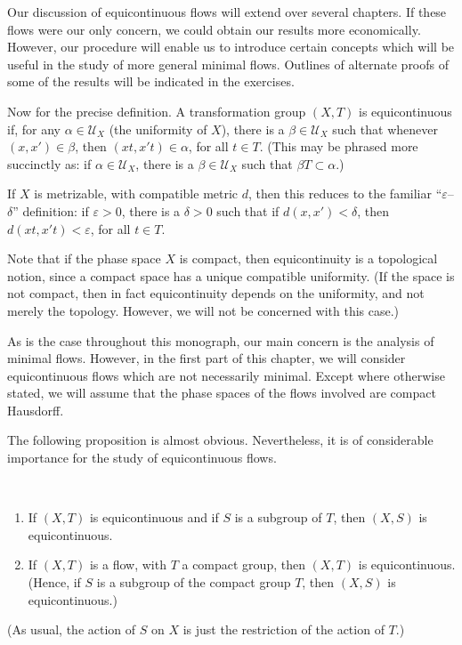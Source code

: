 Our discussion of equicontinuous flows will extend over several chapters. If these flows were our only concern, we could obtain our results more economically. However, our procedure will enable us to introduce certain concepts which will be useful in the study of more general minimal flows. Outlines of alternate proofs of some of the results will be indicated in the exercises.

Now for the precise definition. A transformation group $(X,T)$ is equicontinuous if, for any $\alpha \in \mathcal{U}_X$ (the uniformity of $X$), there is a $\beta \in \mathcal{U}_X$ such that whenever $(x,x') \in \beta$, then $(xt,x't) \in \alpha$, for all $t \in T$.
(This may be phrased more succinctly as: if $\alpha \in \mathcal{U}_X$, there is a $\beta \in \mathcal{U}_X$ such that $\beta T \subset \alpha$.)

If $X$ is metrizable, with compatible metric $d$, then this reduces to the familiar ``$\varepsilon$--$\delta$'' definition: if $\varepsilon > 0$, there is a $\delta > 0$ such that if $d(x,x') < \delta$, then $d(xt,x't) < \varepsilon$, for all $t \in T$.

Note that if the phase space $X$ is compact, then equicontinuity is a topological notion, since a compact space has a unique compatible uniformity. (If the space is not compact, then in fact equicontinuity depends on the uniformity, and not merely the topology. However, we will not be concerned with this case.)



As is the case throughout this monograph, our main concern is the analysis of minimal flows. However, in the first part of this chapter, we will consider equicontinuous flows which are not necessarily minimal. Except where otherwise stated, we will assume that the phase spaces of the flows involved are compact Hausdorff.

The following proposition is almost obvious. Nevertheless, it is of considerable importance for the study of equicontinuous flows.




\begin{proposition}~
    \begin{enumerate}
        \item If $(X,T)$ is equicontinuous and if $S$ is a subgroup of $T$, then $(X,S)$ is equicontinuous.

        \item If $(X,T)$ is a flow, with $T$ a compact group, then $(X,T)$ is equicontinuous. (Hence, if $S$ is a subgroup of the compact group $T$, then $(X,S)$ is equicontinuous.)
    \end{enumerate}

    (As usual, the action of $S$ on $X$ is just the restriction of the action of $T$.)

\end{proposition}

